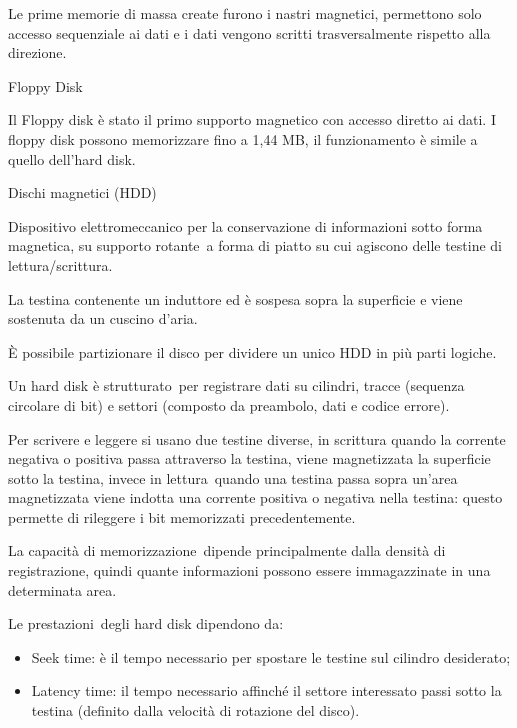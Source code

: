 \documentclass[
]{article}
\providecommand{\tightlist}{%
  \setlength{\itemsep}{0pt}\setlength{\parskip}{0pt}}
\begin{document}
{Le prime memorie di massa create furono i nastri magnetici, permettono
solo accesso sequenziale ai dati e i dati vengono scritti
trasversalmente rispetto alla direzione.}

{}

{Floppy Disk}

{Il Floppy disk è stato il primo supporto magnetico con accesso diretto
ai dati. I floppy disk possono memorizzare fino a 1,44 MB, il
funzionamento è simile a quello dell'hard disk.}

{Dischi magnetici (HDD)}

{Dispositivo elettromeccanico per la conservazione di informazioni sotto
forma magnetica, su }{supporto rotante}{~a forma di piatto su cui
agiscono delle testine di lettura/scrittura.}

{La }{testina }{contenente un induttore ed è sospesa sopra la superficie
e viene sostenuta da un cuscino d'aria.}

{È possibile }{partizionare }{il disco per dividere un unico HDD in più
parti logiche.}

{}

{Un hard disk è strutturato}{~per registrare dati su cilindri, }{tracce
}{(sequenza circolare di bit) e }{settori }{(composto da preambolo, dati
e codice errore)}{.}

{}

{Per scrivere e leggere si usano due testine diverse}{, in }{scrittura
}{quando la corrente negativa o positiva passa attraverso la testina,
viene magnetizzata la superficie sotto la testina, invece in
}{lettura}{~quando una testina passa sopra un'area magnetizzata viene
indotta una corrente positiva o negativa nella testina: questo permette
di rileggere i bit memorizzati precedentemente.}

{}

{La capacità di memorizzazione}{~dipende principalmente dalla densità di
registrazione, quindi quante informazioni possono essere immagazzinate
in una determinata area.}

{}

{Le prestazioni}{~degli hard disk dipendono da:}

{}

\begin{itemize}
\tightlist
\item
  {Seek time}{: è il tempo necessario per spostare le testine sul
  cilindro desiderato;}
\item
  {Latency time}{: il tempo necessario affinché il settore interessato
  passi sotto la testina (definito dalla velocità di rotazione del
  disco).}
\end{itemize}
\end{document}
